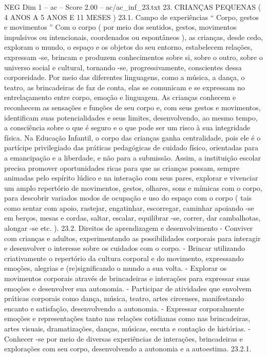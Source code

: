 \begin{textsample}{NEG Dim 1 – ac – Score 2.00 – ac/ac\_inf\_23.txt}  \label{ex:f1_neg_112}
23.
CRIANÇAS PEQUENAS ( 4 ANOS A 5 ANOS E 11 MESES ) 23.1.
Campo de experiências “ Corpo, gestos e movimentos ” Com o corpo ( por meio dos sentidos, gestos, movimentos impulsivos ou intencionais, coordenados ou espontâneos ), as crianças, desde cedo, exploram o mundo, o espaço e os objetos do seu entorno, estabelecem relações, expressam -se, brincam e produzem conhecimentos sobre si, sobre o outro, sobre o universo social e cultural, tornando -se, progressivamente, conscientes dessa corporeidade.
Por meio das diferentes linguagens, como a música, a dança, o teatro, as brincadeiras de faz de conta, elas se comunicam e se expressam no entrelaçamento entre corpo, emoção e linguagem.
As crianças conhecem e reconhecem as sensações e funções de seu corpo e, com seus gestos e movimentos, identificam suas potencialidades e seus limites, desenvolvendo, ao mesmo tempo, a consciência sobre o que é seguro e o que pode ser um risco à sua integridade física.
Na Educação Infantil, o corpo das crianças ganha centralidade, pois ele é o partícipe privilegiado das práticas pedagógicas de cuidado físico, orientadas para a emancipação e a liberdade, e não para a submissão.
Assim, a instituição escolar precisa promover oportunidades ricas para que as crianças possam, sempre animadas pelo espírito lúdico e na interação com seus pares, explorar e vivenciar um amplo repertório de movimentos, gestos, olhares, sons e mímicas com o corpo, para descobrir variados modos de ocupação e uso do espaço com o corpo ( tais como sentar com apoio, rastejar, engatinhar, escorregar, caminhar apoiando -se em berços, mesas e cordas, saltar, escalar, equilibrar -se, correr, dar cambalhotas, alongar -se etc. ). 23.2.
Direitos de aprendizagem e desenvolvimento - Conviver com crianças e adultos, experimentando as possibilidades corporais para interagir e desenvolver o interesse sobre os cuidados com o corpo. - Brincar utilizando criativamente o repertório da cultura corporal e do movimento, expressando emoções, alegrias e (re)significando o mundo a sua volta. - Explorar os movimentos corporais através de brincadeiras e interações para expressar suas emoções e desenvolver sua autonomia. - Participar de atividades que envolvem práticas corporais como dança, música, teatro, artes circenses, manifestando encanto e satisfação, desenvolvendo a autonomia. - Expressar corporalmente emoções e representações tanto nas relações cotidianas como nas brincadeiras, artes visuais, dramatizações, danças, músicas, escuta e contação de histórias. - Conhecer -se por meio de diversas experiências de interações, brincadeiras e explorações com seu corpo, desenvolvendo a autonomia e a autoestima. 23.2.1.

\end{textsample}
